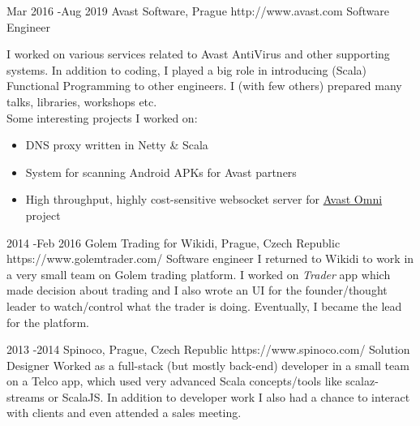 \documentclass[10pt]{article} %
\begin{document}

    \job
    {Mar 2016 -}{Aug 2019}
    {Avast Software, Prague}
    {http://www.avast.com}
    {Software Engineer}
    {I worked on various services related to Avast AntiVirus and other supporting systems. In addition to coding,
        I played a big role in introducing (Scala) Functional Programming to other engineers. I (with few others) prepared many talks, libraries, workshops etc. \\ Some interesting projects I worked on:
        \begin{itemize}
            \item DNS proxy written in Netty \& Scala
            \item System for scanning Android APKs for Avast partners
            \item High throughput, highly cost-sensitive websocket server for \href{https://www.avast.com/en-us/omni}{Avast Omni} project
        \end{itemize}

        }


    \job
    {2014 -}{Feb 2016}
    {Golem Trading for Wikidi, Prague, Czech Republic}
    {https://www.golemtrader.com/}
    {Software engineer}
    {I returned to Wikidi to work in a very small team on Golem trading platform. I worked on \emph{Trader} app which made decision about trading and I also wrote an UI for the founder/thought leader to watch/control what the trader is doing. Eventually, I became the lead for the platform. \\
    }


    \job
    {2013 -}{2014 }
    {Spinoco, Prague, Czech Republic}
    {https://www.spinoco.com/}
    {Solution Designer}
    {Worked as a full-stack (but mostly back-end) developer in a small team on a Telco app, which used very advanced Scala concepts/tools like scalaz-streams or ScalaJS. In addition to developer work I also had a chance to interact with clients and even attended a sales meeting.\\
    }
\end{document}
